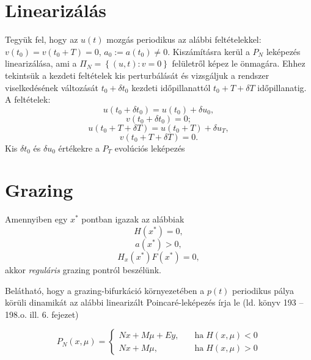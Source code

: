 \section{Linearizálás}

Tegyük fel, hogy az $u(t)$ mozgás periodikus az alábbi feltételekkel: $v(t_0)=v(t_0+T)=0$, $a_0:=a(t_0)\neq 0$. Kiszámításra kerül a $P_N$ leképezés linearizálása, ami a $\Pi_N=\left\{(u,t):v=0\right\}$ felületről képez le önmagára. Ehhez tekintsük a kezdeti feltételek kis perturbálását és vizsgáljuk a rendszer viselkedésének változását $t_0+\delta t_0$ kezdeti időpillanattól $t_0+T+\delta T$ időpillanatig. A feltételek:
\begin{equation}
u(t_0+\delta t_0)=u(t_0)+\delta u_0,
\end{equation}
\begin{equation}
v(t_0+\delta t_0)=0;
\end{equation}
\begin{equation}
u(t_0+T+\delta T)=u(t_0+T)+\delta u_T,
\end{equation}
\begin{equation}
v(t_0+T+\delta T)=0.
\end{equation}
Kis $\delta t_0$ és $\delta u_0$ értékekre a $P_T$ evolúciós leképezés 
\section{Grazing}

Amennyiben egy $x^*$ pontban igazak az alábbiak
\begin{equation}
H(x^*)=0,
\end{equation}
\begin{equation}
a(x^*)>0,
\end{equation}
\begin{equation}
H_x(x^*) F(x^*) = 0,
\end{equation}
akkor \emph{reguláris} grazing pontról beszélünk.

Belátható, hogy a grazing-bifurkáció környezetében a $p(t)$ periodikus pálya körüli dinamikát az alábbi linearizált Poincaré-leképezés  írja le (ld. könyv 193 -- 198.o. ill. 6. fejezet)

\begin{equation}\label{eq:nordmark}
P_N(x,\mu)=\begin{cases}
Nx+M\mu+Ey, \quad &\text{ha} \; H(x,\mu)<0\\
Nx+M\mu, &\text{ha} \; H(x,\mu)>0
\end{cases}
\end{equation}

